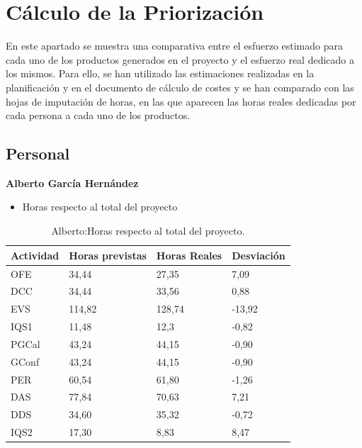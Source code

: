 \section{Cálculo de la Priorización}

\par En este apartado se muestra una comparativa entre el esfuerzo estimado para cada uno de los productos generados en el proyecto y el esfuerzo real dedicado a los mismos. Para ello, se han utilizado las estimaciones realizadas en la planificación y en el documento de cálculo de costes y se han comparado con las hojas de imputación de horas, en las que aparecen las horas reales dedicadas por cada persona a cada uno de los productos.

\subsection{Personal}

\textbf{Alberto García Hernández}
\begin{itemize}
\item Horas respecto al total del proyecto
\end{itemize}
\begin{table}[H]
\begin{center}
\begin{tabular}{ l l l l }
	Actividad & Horas previstas & Horas Reales & Desviación \\ \hline \hline
	 OFE	&	34,44	&	27,35	&	7,09	\\ \hline
DCC	&	34,44	&	33,56	&	0,88	\\ \hline
EVS	&	114,82	&	128,74	&	-13,92	\\ \hline
IQS1	&	11,48	&	12,3	&	-0,82	\\ \hline
PGCal	&	43,24	&	44,15	&	-0,90	\\ \hline
GConf	&	43,24	&	44,15	&	-0,90	\\ \hline
PER	&	60,54	&	61,80	&	-1,26	\\ \hline
DAS	&	77,84	&	70,63	&	7,21	\\ \hline
DDS	&	34,60	&	35,32	&	-0,72	\\ \hline
IQS2	&	17,30	&	8,83	&	8,47	\\ \hline
\end{tabular}
\caption{Alberto:Horas respecto al total del proyecto.}
\label{tab:Alberto:HorasTotalInforme_2}
\end{center}
\end{table}

